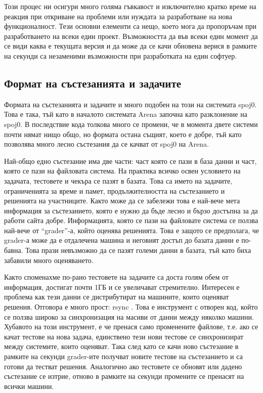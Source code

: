 \documentclass[a4paper,12pt]{article}
\begin{document}
    Този процес ни осигури много голяма гъвкавост и изключително кратко време на реакция при откриване на проблеми или нуждата за разработване на нова функционалност. Тези основни елементи са нещо, което мога да пропоръчам при разработването на всеки един проект. Възможността да във всеки един момент да се види каква е текущата версия и да може да се качи обновена верися в рамките на секунди са незаменими възможности при разработката на един софтуер.
  \subsection{Формат на състезанията и задачите}                              
    Формата на състезанията и задачите и много подобен на този на системата spoj0. Това е така, тъй като в началото системата Arena започна като разклонение на spoj0. В последствие кода толкова много се промени, че в момента двете системи почти нямат нищо общо, но формата остана същият, което е добре, тъй като позволява много лесно състезания да се качват от spoj0 на Arena.
    
    Най-общо едно състезание има две части: част която се пази в база данни и част, която се пази на файловата система. На практика всичко освен условието на задачата, тестовете и чекъра се пазят в базата. Това са името на задачите, ограниченията за време и памет, продължителността на състезанието и решенията на участниците. Както може да се забележи това е най-вече мета информация за състезанието, която е нужно да бъде лесно и бързо достъпна за да работи сайта добре. Информацията, която се пази на файловате система се ползва най-вече от ``grader''-а, който оценява решенията. Това е защото се предполага, че grader-а може да е отдалечена машина и неговият достъп до базата данни е по-бавна. Това прази невъзможно да се пазят големи данни в базата, тъй като биха забавили много оценяването.
    
    Както споменахме по-рано тестовете на задачите са доста голям обем от информация, достигат почти 1ГБ и се увеличават стремително. Интересен е проблема как тези данни се дистрибутират на машините, които оценяват решения. Отговора е много прост: rsync \cite{rsync_site}. Това е инструмент с отворен код, който се ползва широко за синхронизация на масиви от данни между няколко машини. Хубавото на този инструмент, е че пренася само променените файлове, т.е. ако се качат тестове на нова задача, единствено тези нови тестове се синхронизират между системите, които оценяват. Така след като се качи ново състезание в рамките на секунди grader-ите получват новите тестове на състезанието и са готови да тестват решения. Аналогично ако тестовете се обновят или дадено състезание се изтрие, отново в рамките на секунди промените се пренасят на всички машини.
    
\end{document}
